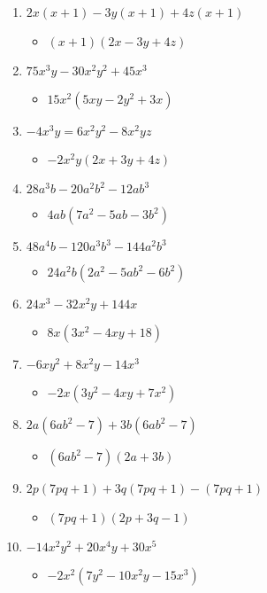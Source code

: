 \documentclass{article}
\begin{document}
\begin{enumerate}
\begin{itemize}
  \end{itemize}
\item $2x(x+1) - 3y(x+1) + 4z(x+1)$
  \begin{itemize}
  \item $(x+1)(2x-3y+4z)$
  \end{itemize}
\item $75x^{3}y - 30x^{2}y^{2} + 45x^{3}$
  \begin{itemize}
  \item $15x^{2}(5xy-2y^{2}+3x)$
  \end{itemize}
\item $-4x^{3}y = 6x^{2}y^{2} - 8x^{2}yz$
  \begin{itemize}
  \item $-2x^{2}y(2x+3y+4z)$
  \end{itemize}
\item $28a^{3}b - 20a^{2}b^{2} - 12ab^{3}$
  \begin{itemize}
  \item $4ab(7a^{2}-5ab-3b^{2})$
  \end{itemize}
\item $48a^{4}b - 120a^{3}b^{3} - 144a^{2}b^{3}$
  \begin{itemize}
  \item $24a^{2}b(2a^{2}-5ab^{2}-6b^{2})$
  \end{itemize}
\item $24x^{3} - 32x^{2}y + 144x$
  \begin{itemize}
  \item $8x(3x^{2}-4xy+18)$
  \end{itemize}
\item $-6xy^{2} + 8x^{2}y - 14x^{3}$
  \begin{itemize}
  \item $-2x(3y^{2}-4xy+7x^{2})$
  \end{itemize}
\item $2a(6ab^{2}-7) + 3b(6ab^{2}-7)$
  \begin{itemize}
  \item $(6ab^{2}-7)(2a+3b)$
  \end{itemize}
\item $2p(7pq+1) + 3q(7pq+1) - (7pq+1)$
  \begin{itemize}
  \item $(7pq+1)(2p+3q-1)$
  \end{itemize}
\item $-14x^{2}y^{2} + 20x^{4}y + 30x^{5}$
  \begin{itemize}
  \item $-2x^{2}(7y^{2}-10x^{2}y-15x^{3})$
  \end{itemize}
\end{enumerate}
\end{document}
